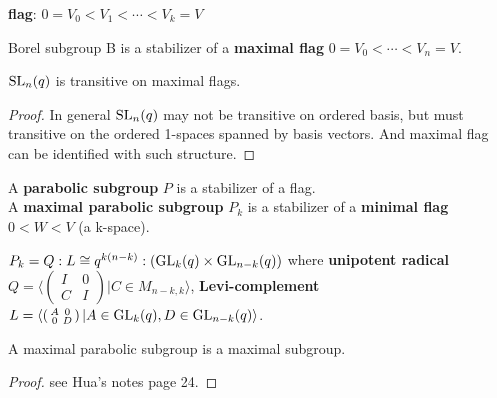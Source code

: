 \documentclass[a4paper,11pt]{article}
\begin{document}
\begin{definition}
    \textbf{flag}: $0=V_0< V_1<\cdots<V_k=V$
\end{definition}

Borel subgroup B is a stabilizer of a \textbf{maximal flag} $0=V_0<\cdots <V_n=V$.

\begin{lemma}
    $\mathrm{SL}_n(q)$ is transitive on maximal flags.
\end{lemma}
\begin{proof}
    In general $\mathrm{SL}_n(q)$ may not be transitive on ordered basis, but must transitive on the ordered 1-spaces spanned by basis vectors. And maximal flag can be identified with such structure.
\end{proof}

\begin{definition}
    A \textbf{parabolic subgroup} $P$ is a stabilizer of a flag.\\
    A \textbf{maximal parabolic subgroup} $P_k$ is a stabilizer of a \textbf{minimal flag} $0<W<V$ (a k-space).
\end{definition}

\begin{proposition}
    $P_k=Q:L\cong q^{k(n-k)}:(\mathrm{GL}_k(q)\times \mathrm{GL}_{n-k}(q))$ where \textbf{unipotent radical} $Q=\langle\left(\begin{smallmatrix}
        I & 0\\C & I
    \end{smallmatrix}\right)| C\in M_{n-k,k}\rangle$, \textbf{Levi-complement} $L=\langle\left(\begin{smallmatrix}
        A & 0\\0 & D
    \end{smallmatrix}\right)| A\in \mathrm{GL}_k(q), D\in \mathrm{GL}_{n-k}(q)\rangle$.
\end{proposition}


\begin{proposition}
    A maximal parabolic subgroup is a maximal subgroup.
\end{proposition}
\begin{proof}
    see Hua's notes page 24.
\end{proof}
\end{document}
